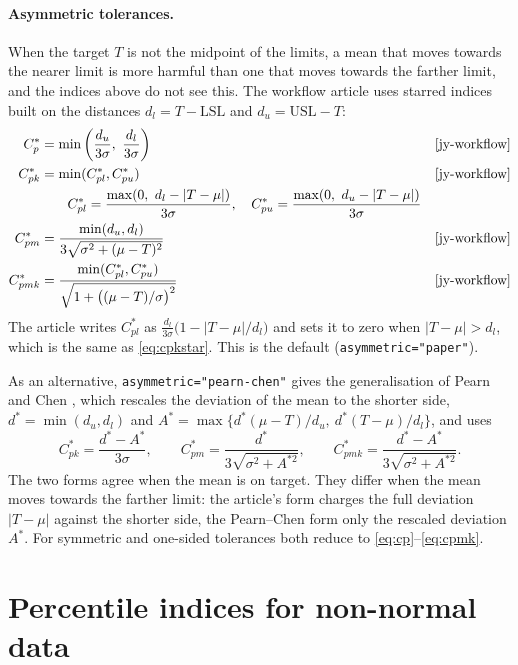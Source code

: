 \documentclass[a4paper,11pt,oneside,openany,parskip=half-,headings=standardclasses,toc=flat,numbers=noenddot]{scrbook}
\newcommand{\code}[1]{\texttt{\begingroup\def\_{\textunderscore\allowbreak}#1\endgroup}}
\begin{document}
\paragraph{Asymmetric tolerances.} When the target $T$ is not the midpoint of the limits, a mean that moves towards
the nearer limit is more harmful than one that moves towards the farther limit, and the indices above do not see
this. The workflow article uses starred indices built on the distances $d_l = T-\mathrm{LSL}$ and
$d_u = \mathrm{USL}-T$:
\begin{align}
C_p^* &= \min\left(\frac{d_u}{3\sigma},\ \frac{d_l}{3\sigma}\right) && \text{\cite[Eq.~(3)]{jy-workflow}}\label{eq:cpstar}\\
C_{pk}^* &= \min(C_{pl}^*, C_{pu}^*) && \text{\cite[Eq.~(5)]{jy-workflow}}\label{eq:cpkstar}\\
&\qquad C_{pl}^* = \frac{\max(0,\ d_l - |T-\mu|)}{3\sigma}, \quad C_{pu}^* = \frac{\max(0,\ d_u - |T-\mu|)}{3\sigma} \notag\\
C_{pm}^* &= \frac{\min(d_u, d_l)}{3\sqrt{\sigma^2+(\mu-T)^2}} && \text{\cite[Eq.~(9)]{jy-workflow}}\label{eq:cpmstar}\\
C_{pmk}^* &= \frac{\min(C_{pl}^*, C_{pu}^*)}{\sqrt{1+\bigl((\mu-T)/\sigma\bigr)^2}} && \text{\cite[Eq.~(13)]{jy-workflow}}\label{eq:cpmkstar}
\end{align}
The article writes $C_{pl}^*$ as $\frac{d_l}{3\sigma}\bigl(1 - |T-\mu|/d_l\bigr)$ and sets it to zero when
$|T-\mu| > d_l$, which is the same as \eqref{eq:cpkstar}. This is the default (\code{asymmetric="paper"}).

As an alternative, \code{asymmetric="pearn-chen"} gives the generalisation of Pearn and Chen \cite{pearn-chen}, which
rescales the deviation of the mean to the shorter side, $d^* = \min(d_u, d_l)$ and
$A^* = \max\{d^*(\mu-T)/d_u,\ d^*(T-\mu)/d_l\}$, and uses
\begin{equation}\label{eq:pearnchen}
C_{pk}^* = \frac{d^*-A^*}{3\sigma}, \qquad
C_{pm}^* = \frac{d^*}{3\sqrt{\sigma^2+A^{*2}}}, \qquad
C_{pmk}^* = \frac{d^*-A^*}{3\sqrt{\sigma^2+A^{*2}}} .
\end{equation}
The two forms agree when the mean is on target. They differ when the mean moves towards the farther limit: the
article's form charges the full deviation $|T-\mu|$ against the shorter side, the Pearn--Chen form only the rescaled
deviation $A^*$. For symmetric and one-sided tolerances both reduce to \eqref{eq:cp}--\eqref{eq:cpmk}.

\section{Percentile indices for non-normal data}\label{app:f-percentile}
\end{document}
